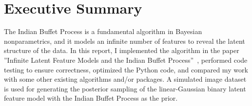 \section*{Executive Summary}

The Indian Buffet Process is a fundamental algorithm in Bayesian nonparametrics, and it models an infinite number of features to reveal the latent structure of the data. In this report, I implemented the algorithm in the paper ''Infinite Latent Feature Models and the Indian Buffet Process''~\cite{griffiths2005infinite}, performed code testing to ensure correctness, optimized the Python code, and compared my work with some other existing algorithms and/or packages. A simulated image dataset is used for generating the posterior sampling of the linear-Gaussian binary latent feature model with the Indian Buffet Process as the prior.